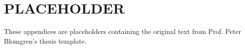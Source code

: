 \appendices
%
%

\chapter{PLACEHOLDER}

These appendices are placeholders containing the original text from Prof. Peter Blomgren's thesis template.



